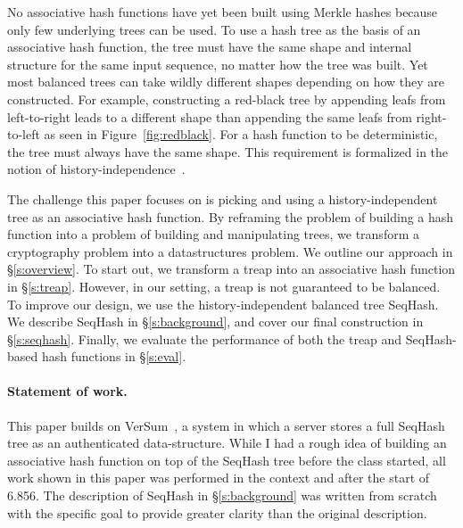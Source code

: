 No associative hash functions have yet been built using Merkle hashes because
only few underlying trees can be used. To use a hash tree as the basis of an
associative hash function, the tree must have the same shape and internal
structure for the same input sequence, no matter how the tree was built. Yet
most balanced trees can take wildly different shapes depending on how they are
constructed. For example, constructing a red-black tree by appending leafs from
left-to-right leads to a different shape than appending the same leafs from
right-to-left as seen in Figure~\ref{fig:redblack}. For a hash function to be deterministic, the tree must always
have the same shape. This requirement is formalized in the notion of
history-independence~\cite{naor:hids}. 

The challenge this paper focuses on is picking and using a history-independent
tree as an associative hash function.  By reframing the problem of building a
hash function into a problem of building and manipulating trees, we transform a
cryptography problem into a datastructures problem. We outline our approach in
\S\ref{s:overview}.  To start out, we transform a treap into an associative
hash function in \S\ref{s:treap}. However, in our setting, a treap is not
guaranteed to be balanced. To improve our design, we use the
history-independent balanced tree SeqHash. We describe SeqHash in
\S\ref{s:background}, and cover our final construction in \S\ref{s:seqhash}.
Finally, we evaluate the performance of both the treap and SeqHash-based hash
functions in \S\ref{s:eval}.

\paragraph{Statement of work.} This paper builds on VerSum~\cite{versum:ccs14},
a system in which a server stores a full SeqHash tree as an authenticated
data-structure. While I had a rough idea of building an associative hash
function on top of the SeqHash tree before the class started, all work shown in
this paper was performed in the context and after the start of 6.856. The
description of SeqHash in \S\ref{s:background} was written from scratch with the
specific goal to provide greater clarity than the original description.


